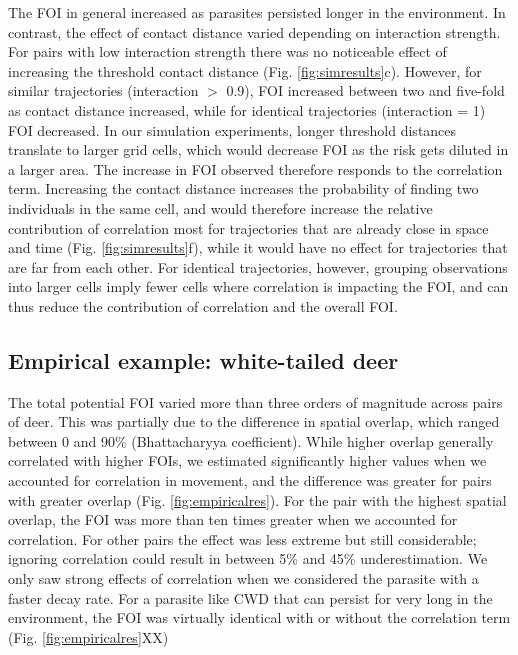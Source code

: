 \documentclass[letterpaper]{article}
\begin{document}
The FOI in general increased as parasites persisted longer in the environment. In contrast, the effect of contact distance varied depending on interaction strength. For pairs with low interaction strength there was no noticeable effect of increasing the threshold contact distance (Fig. \ref{fig:simresults}c). However, for  similar trajectories (interaction $>$ 0.9), FOI increased between two and five-fold as contact distance increased, while for identical trajectories (interaction = 1) FOI decreased. 
In our simulation experiments, longer threshold distances translate to larger grid cells, which would decrease FOI as the risk gets diluted in a larger area. The increase in FOI observed therefore responds to the correlation term. Increasing the contact distance increases the probability of finding two individuals in the same cell, and would therefore increase the relative contribution of correlation most for trajectories that are already close in space and time (Fig. \ref{fig:simresults}f), while it would have no effect for trajectories that are far from each other. For identical trajectories, however, grouping observations into larger cells imply fewer cells where correlation is impacting the FOI, and can thus reduce the contribution of correlation and the overall FOI. 

\subsection*{Empirical example: white-tailed deer}

The total potential FOI varied more than three orders of magnitude across pairs of deer. This was partially due to the difference in spatial overlap, which ranged between 0 and 90\% (Bhattacharyya coefficient). While higher overlap generally correlated with higher FOIs, we estimated significantly higher values when we accounted for correlation in movement, and the difference was greater for pairs with greater overlap (Fig. \ref{fig:empiricalres}). For the pair with the highest spatial overlap, the FOI was more than ten times greater when we accounted for correlation. For other pairs the effect was less extreme but still considerable; ignoring correlation could result in between 5\% and 45\% underestimation. 
We only saw strong effects of correlation when we considered the parasite with a faster decay rate. For a parasite like CWD that can persist for very long in the environment, the FOI was virtually identical with or without the correlation term (Fig. \ref{fig:empiricalres}XX)
\end{document}
